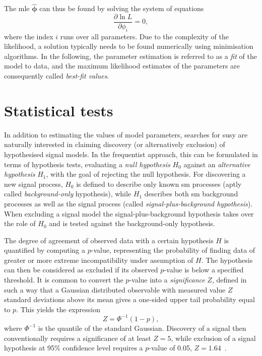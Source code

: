 The \gls{mle} $\boldsymbol{\hat{\phi}}$ can thus be found by solving the system of equations
\begin{equation}
 \frac{\partial \ln L}{\partial\phi_i} = 0,
\end{equation}
where the index $i$ runs over all parameters. Due to the complexity of the likelihood, a solution typically needs to be found numerically using minimisation algorithms. In the following, the parameter estimation is referred to as a \textit{fit} of the model to data, and the maximum likelihood estimates of the parameters are consequently called \textit{best-fit values}.

\section{Statistical tests}

In addition to estimating the values of model parameters, searches for \gls{susy} are naturally interested in claiming discovery (or alternatively exclusion) of hypothesised signal models. In the frequentist approach, this can be formulated in terms of hypothesis tests, evaluating a \textit{null hypothesis} $H_0$ against an \textit{alternative hypothesis} $H_1$, with the goal of rejecting the null hypothesis. For discovering a new signal process, $H_0$ is defined to describe only known \gls{sm} processes (aptly called \textit{background-only} hypothesis), while $H_1$ describes both \gls{sm} background processes as well as the signal process (called \textit{signal-plus-background hypothesis}). When excluding a signal model the signal-plus-background hypothesis takes over the role of $H_0$ and is tested against the background-only hypothesis.

The degree of agreement of observed data with a certain hypothesis $H$ is quantified by computing a $p$-value, representing the probability of finding data of greater or more extreme incompatibility under assumption of $H$. The hypothesis can then be considered as excluded if its observed $p$-value is below a specified threshold. It is common to convert the $p$-value into a \textit{significance} $Z$, defined in such a way that a Gaussian distributed observable with measured value $Z$ standard deviations above its mean gives a one-sided upper tail probability equal to $p$. This yields the expression
\begin{equation}
	Z = \Phi^{-1}(1-p),
	\label{eq:significance}
\end{equation}
where $\Phi^{-1}$ is the quantile of the standard Gaussian. Discovery of a signal then conventionally requires a significance of at least $Z = 5$, while exclusion of a signal hypothesis at 95\% confidence level requires a $p$-value of 0.05, \ie $Z = 1.64$~\cite{Cowan:2010js}. 

